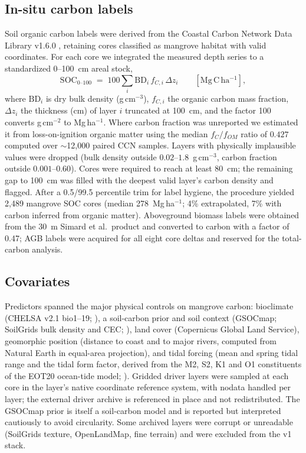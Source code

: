 \documentclass[11pt]{article}
\begin{document}
\subsection{In-situ carbon labels}
Soil organic carbon labels were derived from the Coastal Carbon Network Data Library
v1.6.0 \citep{ccn2024}, retaining cores classified as mangrove habitat with valid
coordinates. For each core we integrated the measured depth series to a standardized
0--100~cm areal stock,
\begin{equation}
\mathrm{SOC}_{0\text{--}100} \;=\; 100 \sum_i \mathrm{BD}_i \, f_{C,i}\, \Delta z_i
\qquad [\mathrm{Mg\,C\,ha^{-1}}],
\label{eq:soc}
\end{equation}
where $\mathrm{BD}_i$ is dry bulk density (g\,cm$^{-3}$), $f_{C,i}$ the organic carbon
mass fraction, $\Delta z_i$ the thickness (cm) of layer $i$ truncated at 100~cm, and
the factor 100 converts g\,cm$^{-2}$ to Mg\,ha$^{-1}$. Where carbon fraction was
unreported we estimated it from loss-on-ignition organic matter using the median
$f_C/f_{OM}$ ratio of $0.427$ computed over $\sim$12{,}000 paired CCN samples. Layers
with physically implausible values were dropped (bulk density outside
$0.02$--$1.8$~g\,cm$^{-3}$, carbon fraction outside $0.001$--$0.60$). Cores were
required to reach at least 80~cm; the remaining gap to 100~cm was filled with the
deepest valid layer's carbon density and flagged. After a 0.5/99.5 percentile trim for
label hygiene, the procedure yielded 2{,}489 mangrove SOC cores (median
278~Mg\,ha$^{-1}$; 4\% extrapolated, 7\% with carbon inferred from organic matter).
Aboveground biomass labels were obtained from the 30~m Simard et al.\ product
\citep{simard2019,simard2019data} and converted to carbon with a factor of 0.47; AGB
labels were acquired for all eight core deltas and reserved for the total-carbon
analysis.

\subsection{Covariates}
Predictors spanned the major physical controls on mangrove carbon: bioclimate (CHELSA
v2.1 bio1--19; \citealp{karger2017chelsa}), a soil-carbon prior and soil context
(GSOCmap; SoilGrids bulk density and CEC; \citealp{poggio2021soilgrids}), land cover
(Copernicus Global Land Service), geomorphic position (distance to coast and to major
rivers, computed from Natural Earth in equal-area projection), and tidal forcing (mean
and spring tidal range and the tidal form factor, derived from the M2, S2, K1 and O1
constituents of the EOT20 ocean-tide model; \citealp{hartdavis2021eot20}). Gridded
driver layers were sampled at each core in the layer's native coordinate reference
system, with nodata handled per layer; the external driver archive is referenced in
place and not redistributed. The GSOCmap prior is itself a soil-carbon model and is
reported but interpreted cautiously to avoid circularity. Some archived layers were
corrupt or unreadable (SoilGrids texture, OpenLandMap, fine terrain) and were excluded
from the v1 stack.
\end{document}

